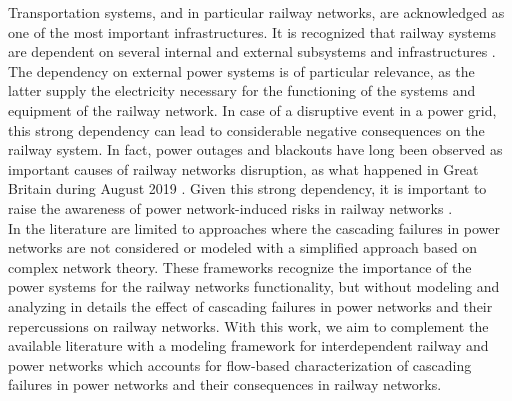 \documentclass[review]{elsarticle}
\begin{document}
	Transportation systems, and in particular railway networks, are acknowledged as one of the most important infrastructures. It is recognized that railway systems are dependent on several internal and external subsystems and infrastructures \cite{pant2016vulnerability}. The dependency on external power systems is of particular relevance, as the latter supply the electricity necessary for the functioning of the systems and equipment of the railway network. In case of a disruptive event in a power grid, this strong dependency can lead to considerable negative consequences on the railway system. In fact, power outages and blackouts have long been observed as important causes of railway networks disruption, as what happened in Great Britain during August 2019 \cite{GBblackout_1}\cite{GBblackout_2}. Given this strong dependency, it is important to raise the awareness of power network-induced risks in railway networks \cite{uicenews616}.\\
	In the literature are limited to approaches where the cascading failures in power networks are not considered or modeled with a simplified approach based on complex network theory. These frameworks recognize the importance of the power systems for the railway networks functionality, but without modeling and analyzing in details the effect of cascading failures in power networks and their repercussions on railway networks. With this work, we aim to complement the available literature with a modeling framework for interdependent railway and power networks which accounts for flow-based characterization of cascading failures in power networks and their consequences in railway networks.
	
\end{document}

